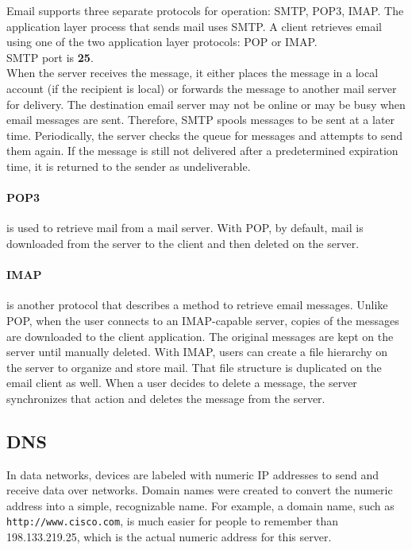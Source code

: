 Email supports three separate protocols for operation: SMTP, POP3, IMAP. The application layer process that sends mail uses SMTP. A client retrieves email using one of the two application layer protocols: POP or IMAP.\\

SMTP port is \textbf{25}. \\

When the server receives the message, it either places the message in a local account (if the recipient is local) or forwards the message to another mail server for delivery. The destination email server may not be online or may be busy when email messages are sent. Therefore, SMTP spools messages to be sent at a later time. Periodically, the server checks the queue for messages and attempts to send them again. If the message is still not delivered after a predetermined expiration time, it is returned to the sender as undeliverable. \\

\paragraph{POP3} is used to retrieve mail from a mail server. With POP, by default, mail is downloaded from the server to the client and then deleted on the server. 

\paragraph{IMAP} is another protocol that describes a method to retrieve email messages. Unlike POP, when the user connects to an IMAP-capable server, copies of the messages are downloaded to the client application.  The original messages are kept on the server until manually deleted. With IMAP, users can create a file hierarchy on the server to organize and store mail. That file structure is duplicated on the email client as well. When a user decides to delete a message, the server synchronizes that action and deletes the message from the server.

\subsection{DNS}

In data networks, devices are labeled with numeric IP addresses to send and receive data over networks. Domain names were created to convert the numeric address into a simple, recognizable name. For example, a domain name, such as \verb|http://www.cisco.com|, is much easier for people to remember than 198.133.219.25, which is the actual numeric address for this server. \\

